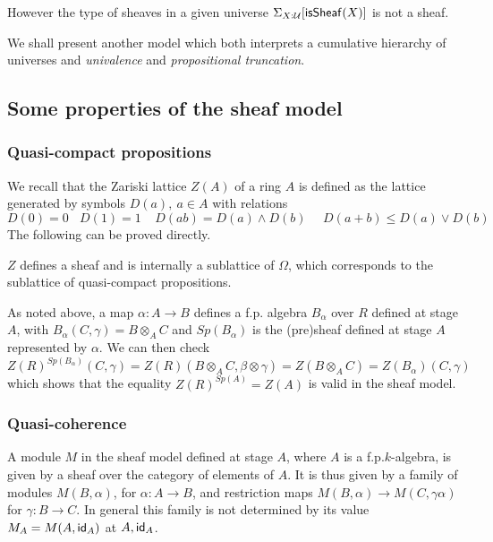     \medskip

    However the type of sheaves in a given universe $\Sigma_{X:\mathcal{U}}[\mathsf{isSheaf}(X)]$ is not a sheaf.

    We shall present another model which both interprets a cumulative hierarchy of universes
    and {\em univalence} and {\em propositional truncation}.

    \subsection{Some properties of the sheaf model}

    \subsubsection{Quasi-compact propositions}

    We recall \cite{lombardi-quitte}
    that the Zariski lattice $Z(A)$ of a ring $A$ is defined as the lattice generated by symbols $D(a),~a\in A$
    with relations
    $$
    D(0) = 0~~~~D(1) = 1~~~~~D(ab) = D(a)\wedge D(b)~~~~~~D(a+b)\leqslant D(a)\vee D(b)
    $$
    The following can be proved directly.

    \begin{proposition}
      $Z$ defines a sheaf and is internally a sublattice of $\Omega$, which corresponds to the sublattice of quasi-compact
      propositions.
    \end{proposition}
    
    As noted above, a map $\alpha:A\rightarrow B$ defines a f.p. algebra $B_{\alpha}$ over $R$ defined at stage $A$, with
    $B_{\alpha}(C,\gamma) = B\otimes_A C$ and $Sp(B_{\alpha})$ is
    the (pre)sheaf defined at stage $A$ represented by $\alpha$.
    We can then check
    $$Z(R)^{Sp(B_{\alpha})}(C,\gamma) = Z(R)(B\otimes_A C,\beta\otimes\gamma) = Z(B\otimes_A C) = Z(B_{\alpha})(C,\gamma)$$
    which shows that the equality $Z(R)^{Sp(A)} = Z(A)$ is valid in the sheaf model.

    \subsubsection{Quasi-coherence}

A module $M$ in the sheaf model defined at stage $A$, where $A$ is a f.p.\@ $k$-algebra, is given by a sheaf over the category
of elements of $A$. It is thus given by a family of modules $M(B,\alpha)$, for $\alpha:A\rightarrow B$, and restriction maps
$M(B,\alpha)\rightarrow M(C,\gamma\alpha)$ for $\gamma:B\rightarrow C$. In general this family is not determined by
its value $M_A = M(A,\mathsf{id}_A)$ at $A,\mathsf{id}_A$.

